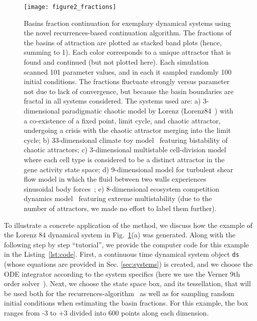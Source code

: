 \documentclass[%
 aip,
 amsmath,amssymb,
 reprint,%
]{revtex4-1}
\begin{document}
\begin{figure}[!t]
    \centering
    \texttt{[image: figure2\_fractions]}
    \caption{Basins fraction continuation for exemplary dynamical systems using the novel recurrences-based continuation algorithm. The fractions of the basins of attraction are plotted as stacked band plots (hence, summing to 1). Each color corresponds to a unique attractor that is found and continued (but not plotted here). Each simulation scanned 101 parameter values, and in each it sampled randomly 100 initial conditions. The fractions fluctuate strongly versus parameter not due to lack of convergence, but because the basin boundaries are fractal in all systems considered.
    The systems used are: 
    a) 3-dimensional paradigmatic chaotic model by Lorenz (Lorenz84~\cite{Lorenz84}) with a co-existence of a fixed point, limit cycle, and chaotic attractor, undergoing a crisis with the chaotic attractor merging into the limit cycle; 
    b) 33-dimensional climate toy model~\cite{Gelbrecht2021} featuring bistability of chaotic attractors;
    c) 3-dimensional multistable cell-division model~\cite{huang2006multistability} where each cell type is considered to be a distinct attractor in the gene activity state space;
    d) 9-dimensional model for turbulent shear flow model in which the fluid between two walls experiences sinusoidal body forces~\cite{moehlis2004low};
    e) 8-dimensional ecosystem competition dynamics model~\cite{huisman2001fundamental} featuring extreme multistability (due to the number of attractors, we made no effort to label them further).
    }
    \label{fig:exemplary_fractions}
\end{figure}

To illustrate a concrete application of the method, we discuss how the example of the Lorenz 84 dynamical system in Fig.~\ref{fig:exemplary_fractions}(a) was generated. Along with the following step by step ``tutorial'', we provide the computer code for this example in the Listing~\ref{lst:code}. First, a continuous time dynamical system object \texttt{ds} (whose equations are provided in Sec. \ref{sec:systems}) is created, and we choose the ODE integrator according to the system specifics (here we use the Verner 9th order solver~\cite{verner2010numerically}). Next, we choose the state space box, and its tessellation, that will be used both for the recurrences-algorithm~\cite{DatserisWagemakers2022} as well as for sampling random initial conditions when estimating the basin fractions. For this example, the box ranges from -3 to +3 divided into 600 points along each dimension.
\end{document}
